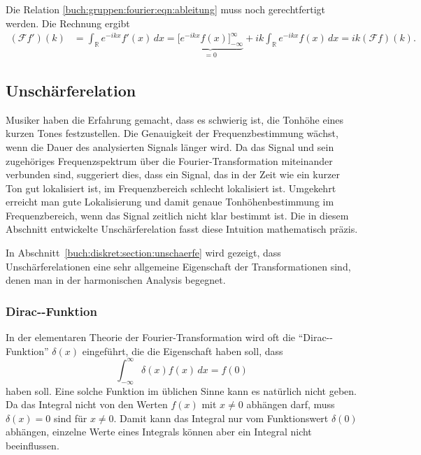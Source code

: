Die Relation \eqref{buch:gruppen:fourier:eqn:ableitung} muss noch
gerechtfertigt werden.
Die Rechnung ergibt
\begin{align*}
(\mathscr{F}f')(k)
&=
\int_{\mathbb{R}} e^{-ikx} f'(x)\,dx
=
\underbrace{
\biggl[
e^{-ikx}f(x)
\biggr]_{-\infty}^\infty
}_{\displaystyle = 0}
+ik
\int_{\mathbb{R}} e^{-ikx} f(x)\,dx
=
ik(\mathscr{F}f)(k).
\end{align*}

%
%
\subsection{Unschärferelation
\label{buch:gruppen:fourier:subsection:unschaerfe}}
Musiker haben die Erfahrung gemacht, dass es schwierig ist, die
Tonhöhe eines kurzen Tones festzustellen.
Die Genauigkeit der Frequenzbestimmung wächst, wenn die Dauer des
analysierten Signals länger wird.
Da das Signal und sein zugehöriges Frequenzspektrum über die
Fourier-Transformation miteinander verbunden sind, suggeriert dies,
dass ein Signal, das in der Zeit wie ein kurzer Ton gut lokalisiert ist,
im Frequenzbereich schlecht lokalisiert ist.
Umgekehrt erreicht man gute Lokalisierung und damit genaue Tonhöhenbestimmung
im Frequenzbereich, wenn das Signal zeitlich nicht klar bestimmt ist.
Die in diesem Abschnitt entwickelte Unschärferelation fasst diese
Intuition mathematisch präzis.

In Abschnitt~\ref{buch:diskret:section:unschaerfe} wird gezeigt, dass
Unschärferelationen eine sehr allgemeine Eigenschaft der Transformationen
sind, denen man in der harmonischen Analysis begegnet.

%
%
\subsubsection{Dirac-\textdelta-Funktion}
In der elementaren Theorie der Fourier-Transformation wird oft 
die ``Dirac-\textdelta-Funktion'' $\delta(x)$ eingeführt, die die
Eigenschaft haben soll, dass
\begin{equation}
\int_{-\infty}^\infty \delta(x) f(x)\,dx = f(0)
\label{buch:gruppen:fourier:eqn:deltadef}
\end{equation}
haben soll.
Eine solche Funktion im üblichen Sinne kann es natürlich nicht geben.
Da das Integral nicht von den Werten $f(x)$ mit $x\ne 0$ abhängen darf,
muss $\delta(x)=0$ sind für $x\ne 0$.
Damit kann das Integral nur vom Funktionswert $\delta(0)$ abhängen,
einzelne Werte eines Integrals können aber ein Integral nicht beeinflussen.

